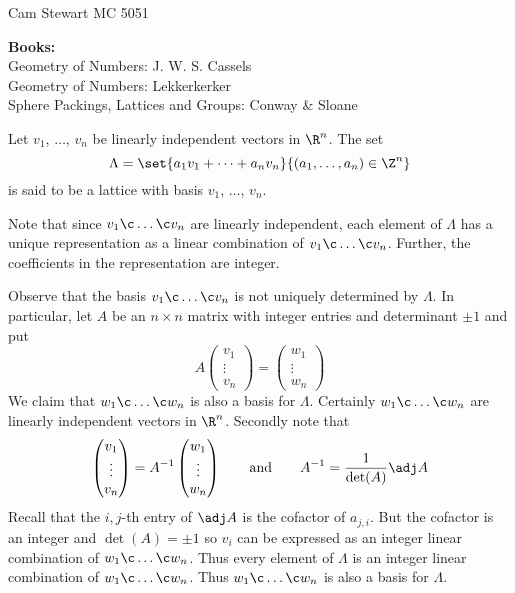 Cam Stewart MC 5051

\textbf{Books:} \\
Geometry of Numbers: J. W. S. Cassels \\
Geometry of Numbers: Lekkerkerker \\
Sphere Packings, Lattices and Groups: Conway \& Sloane

Let $v_1$, $\dotsc$, $v_n$ be linearly independent vectors in $\R^n$.  The set
\[ \Lambda = \set{ a_1v_1+\dotsb+a_nv_n }{ (a_1,\dotsc,a_n)\in\Z^n } \]
is said to be a lattice with basis $v_1$, $\dotsc$, $v_n$.

Note that since $v_1\c \dotsc\c v_n$ are linearly independent, each element of $\Lambda$ has a unique representation as a linear combination of $v_1\c \dotsc\c v_n$.  Further, the coefficients in the representation are integer.

Observe that the basis $v_1\c \dotsc\c v_n$ is not uniquely determined by $\Lambda$.  In particular, let $A$ be an $n\times n$ matrix with integer entries and determinant $\pm1$ and put
\[ A \begin{pmatrix}v_1\\\vdots\\v_n\end{pmatrix} = \begin{pmatrix}w_1\\\vdots\\w_n\end{pmatrix} \]
We claim that $w_1\c \dotsc\c w_n$ is also a basis for $\Lambda$.  Certainly $w_1\c \dotsc\c w_n$ are linearly independent vectors in $\R^n$.  Secondly note that
\[ \begin{pmatrix}v_1\\\vdots\\v_n\end{pmatrix} = A^{-1}\begin{pmatrix}w_1\\\vdots\\w_n\end{pmatrix} \qquad\text{and}\qquad A^{-1}=\frac{1}{\det(A)}\adj A \]
Recall that the $i,j$-th entry of $\adj A$ is the cofactor of $a_{j,i}$.  But the cofactor is an integer and $\det(A)=\pm1$ so $v_i$ can be expressed as an integer linear combination of $w_1\c \dotsc\c w_n$.  Thus every element of $\Lambda$ is an integer linear combination of $w_1\c \dotsc\c w_n$.  Thus $w_1\c \dotsc\c w_n$ is also a basis for $\Lambda$.

